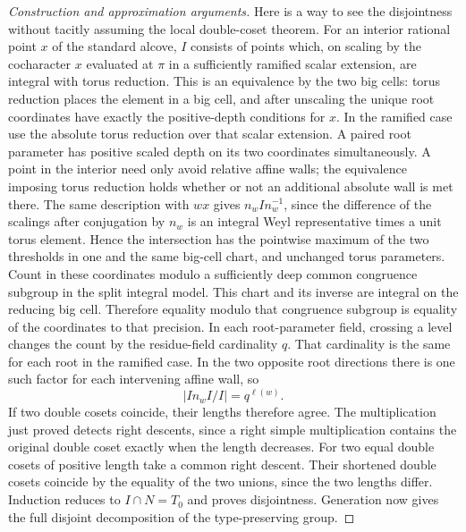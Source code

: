 \documentclass[11pt,a4paper,openany,oneside]{book}
\theoremstyle{resultstyle}
\theoremstyle{definition}
\numberwithin{equation}{chapter}
\begin{document}
\begin{proof}[Construction and approximation arguments]
Here is a way to see the disjointness without tacitly assuming
the local double-coset theorem. For an interior rational point
\(x\) of the standard alcove, \(I\) consists of points which,
on scaling by the cocharacter \(x\) evaluated at \(\pi\) in
a sufficiently ramified scalar extension, are integral with
torus reduction. This is an equivalence by the two big cells:
torus reduction places the element in a big cell, and after
unscaling the unique root coordinates have exactly the
positive-depth conditions for \(x\). In the ramified case use
the absolute torus reduction over that scalar extension.
A paired root parameter has positive scaled depth on its two
coordinates simultaneously. A point in the interior need only
avoid relative affine walls; the equivalence imposing torus
reduction holds whether or not an additional absolute wall
is met there. The same description with \(w x\) gives
\(n_w I n_w^{-1}\), since the difference of the scalings
after conjugation by \(n_w\) is an integral Weyl representative
times a unit torus element. Hence the intersection has the
pointwise maximum of the two thresholds in one and the same
big-cell chart, and unchanged torus parameters. Count in these
coordinates modulo a sufficiently deep common congruence
subgroup in the split integral model. This chart and its inverse
are integral on the reducing big cell. Therefore equality
modulo that congruence subgroup is equality of the coordinates
to that precision. In each root-parameter field, crossing a
level changes the count by the residue-field cardinality \(q\).
That cardinality is the same for each root in the ramified
case. In the two opposite root directions there is one such
factor for each intervening affine wall, so
\[
       |I n_w I/I|=q^{\ell(w)}.
\]
If two double cosets coincide, their lengths therefore agree.
The multiplication just proved detects right descents, since
a right simple multiplication contains the original double
coset exactly when the length decreases. For two equal
double cosets of positive length take a common right descent.
Their shortened double cosets coincide by the equality of the
two unions, since the two lengths differ. Induction reduces to
\(I\cap N=T_0\) and proves disjointness. Generation now gives
the full disjoint decomposition of the type-preserving group.


\end{proof}
\end{document}
